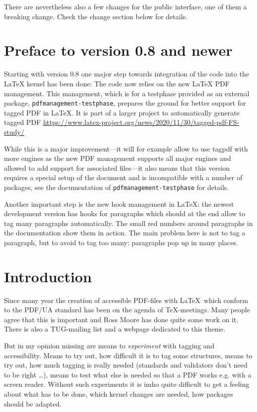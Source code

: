 \documentclass[DIV=12,parskip=half-,bibliography=totoc]{scrartcl}
\newcommand\PDF{PDF}
\begin{document}
There are nevertheless also a few changes for the public interface, one of them a breaking change. Check the change section below for 
details. 

\section{Preface to version 0.8 and newer}

Starting with version 0.8 one major step towards integration of the code into the \LaTeX{} kernel has been done:
The code now relies on the new \LaTeX{} PDF management. This management, which is for a testphase provided
as an external package, \texttt{pdfmanagement-testphase},
prepares the ground for better support for tagged PDF in \LaTeX{}.
It is part of a larger project to automatically generate tagged PDF \url{https://www.latex-project.org/news/2020/11/30/tagged-pdf-FS-study/}

While this is a major improvement---it will for example allow to use tagpdf with more engines as the new PDF management supports all major engines and allowed to add support for associated files---it also means that this version requires a special setup of the document and is incompatible with a number of packages,
see the documentation of \texttt{pdfmanagement-testphase} for details.

Another important step is the new hook management in \LaTeX: the newest development version has hooks for paragraphs which should at the end allow to tag many paragraphs automatically. The small red numbers around paragraphs in the documentation show them in action. The main problem here is not to tag a paragraph, but to avoid to tag too many: paragraphs pop up in many places.

\section{Introduction}

Since many year the creation of accessible \PDF{}-files with \LaTeX\ which conform to the PDF/UA standard has been on the agenda of \TeX-meetings. Many people agree that this is important and Ross Moore has done quite some work on it. There is also a TUG-mailing list and a webpage \parencite{tugaccess} dedicated to this theme.

But in my opinion missing are means to \emph{experiment} with tagging and accessibility. Means to try out, how difficult it is to tag some structures, means to try out, how much tagging is really needed (standards and validators don't need to be right \ldots), means to test what else is needed so that a \PDF{} works e.g. with a screen reader. Without such experiments it is imho quite difficult to get a feeling about what has to be done, which kernel changes are needed, how packages should be adapted.
\end{document}
